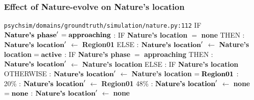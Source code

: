 \documentclass{article}%
\begin{document}
\subsubsection{Effect of Nature{-}evolve on Nature's location}%
\label{ssubsec:Effect of Nature{-}evolve on Nature's location}%
\begin{flushleft}%
\verb|psychsim/domains/groundtruth/simulation/nature.py:112|%
\linebreak%
IF %
$\mbox{\textbf{Nature's phase}} '$%
\linebreak%
\hspace*{2em}%
$= \mbox{\textbf{approaching}}$%
: %
IF %
\textbf{Nature's location}%
$=$%
\textbf{none}%
\linebreak%
\hspace*{4em}%
THEN %
: %
$\mbox{\textbf{Nature's location}} '$%
$\leftarrow$%
\textbf{Region01}%
\linebreak%
\hspace*{4em}%
ELSE %
: %
$\mbox{\textbf{Nature's location}} '$%
$\leftarrow$%
\textbf{Nature's location}%
\linebreak%
\hspace*{2em}%
$= \mbox{\textbf{active}}$%
: %
IF %
\textbf{Nature's phase}%
$=$%
\textbf{approaching}%
\linebreak%
\hspace*{4em}%
THEN %
: %
$\mbox{\textbf{Nature's location}} '$%
$\leftarrow$%
\textbf{Nature's location}%
\linebreak%
\hspace*{4em}%
ELSE %
: %
IF %
\textbf{Nature's location}%
\linebreak%
\hspace*{6em}%
OTHERWISE %
: %
$\mbox{\textbf{Nature's location}} '$%
$\leftarrow$%
\textbf{Nature's location}%
\linebreak%
\hspace*{6em}%
$= \mbox{\textbf{Region01}}$%
: %
\linebreak%
\hspace*{8em}%
20\%%
: %
$\mbox{\textbf{Nature's location}} '$%
$\leftarrow$%
\textbf{Region01}%
\linebreak%
\hspace*{8em}%
48\%%
: %
$\mbox{\textbf{Nature's location}} '$%
$\leftarrow$%
\textbf{none}%
\linebreak%
\hspace*{2em}%
$= \mbox{\textbf{none}}$%
: %
$\mbox{\textbf{Nature's location}} '$%
$\leftarrow$%
\textbf{none}%
\end{flushleft}
\end{document}
